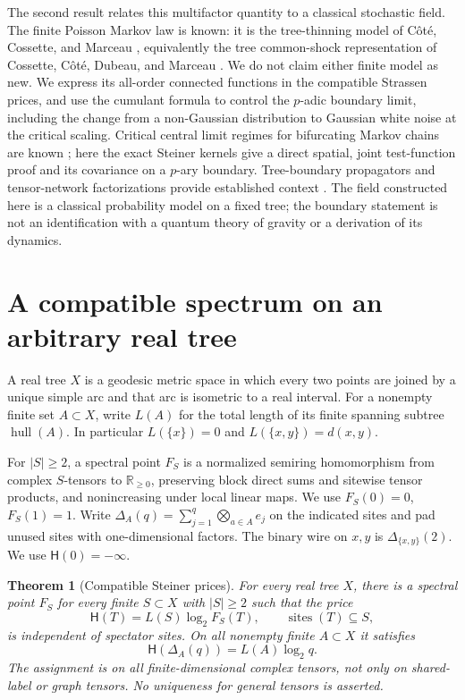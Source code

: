 \documentclass[11pt]{article}
\newtheorem{theorem}{Theorem}[section]
\theoremstyle{remark}
\newcommand{\hull}{\operatorname{hull}}
\newcommand{\D}{\Delta}
\newcommand{\hprice}{\mathsf H}
\begin{document}
The second result relates this multifactor quantity to a classical stochastic field. The finite Poisson Markov law is known: it is the tree-thinning model of C\^ot\'e, Cossette, and Marceau \cite{Cote}, equivalently the tree common-shock representation of Cossette, C\^ot\'e, Dubeau, and Marceau \cite{Cossette}. We do not claim either finite model as new. We express its all-order connected functions in the compatible Strassen prices, and use the cumulant formula to control the \(p\)-adic boundary limit, including the change from a non-Gaussian distribution to Gaussian white noise at the critical scaling. Critical central limit regimes for bifurcating Markov chains are known \cite{BDpoint,BDl2}; here the exact Steiner kernels give a direct spatial, joint test-function proof and its covariance on a \(p\)-ary boundary. Tree-boundary propagators and tensor-network factorizations provide established context \cite{Gubser,GP,HLM}. The field constructed here is a classical probability model on a fixed tree; the boundary statement is not an identification with a quantum theory of gravity or a derivation of its dynamics.

\section{A compatible spectrum on an arbitrary real tree}

A real tree \(X\) is a geodesic metric space in which every two points are joined by a unique simple arc and that arc is isometric to a real interval. For a nonempty finite set \(A\subset X\), write \(L(A)\) for the total length of its finite spanning subtree \(\hull(A)\). In particular \(L(\{x\})=0\) and \(L(\{x,y\})=d(x,y)\).

For \(|S|\ge 2\), a spectral point \(F_S\) is a normalized semiring homomorphism from complex \(S\)-tensors to \(\mathbb R_{\ge0}\), preserving block direct sums and sitewise tensor products, and nonincreasing under local linear maps. We use \(F_S(0)=0\), \(F_S(1)=1\). Write \(\D_A(q)=\sum_{j=1}^q\bigotimes_{a\in A}e_j\) on the indicated sites and pad unused sites with one-dimensional factors. The binary wire on \(x,y\) is \(\D_{\{x,y\}}(2)\). We use \(\hprice(0)=-\infty\).

\begin{theorem}[Compatible Steiner prices]\label{thm:tree}
For every real tree \(X\), there is a spectral point \(F_S\) for every finite \(S\subset X\) with \(|S|\ge 2\) such that the price
\[
 \hprice(T)=L(S)\log_2 F_S(T),\qquad \operatorname{sites}(T)\subseteq S ,
\]
is independent of spectator sites. On all nonempty finite \(A\subset X\) it satisfies
\begin{equation}\label{eq:steiner}
 \hprice(\D_A(q))=L(A)\log_2 q .
\end{equation}
The assignment is on all finite-dimensional complex tensors, not only on shared-label or graph tensors. No uniqueness for general tensors is asserted.
\end{theorem}
\end{document}
